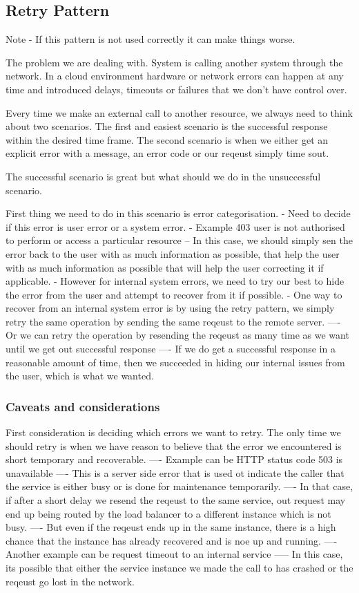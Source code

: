 \subsection{Retry Pattern}
Note - If this pattern is not used correctly it can make things worse.

The problem we are dealing with.
System is calling another system through the network.
In a cloud environment hardware or network errors can happen at any time and introduced delays, timeouts or failures that we don't have control over.

Every time we make an external call to another resource, we always need to think about two scenarios.
The first and easiest scenario is the successful response within the desired time frame.
The second scenario is when we either get an explicit error with a message, an error code or our reqeust simply time sout.

The successful scenario is great but what should we do in the unsuccessful scenario.

First thing we need to do in this scenario is error categorisation.
- Need to decide if this error is user error or a system error.
- Example 403 user is not authorised to perform or access a particular resource
-- In this case, we should simply sen the error back to the user with as much information as possible, that help the user with as much information as possible that will help the user correcting it if applicable.
- However for internal system errors, we need to try our best to hide the error from the user and attempt to recover from it if possible.
- One way to recover from an internal system error is by using the retry pattern, we simply retry the same operation by sending the same reqeust to the remote server.
---- Or we can retry the operation by resending the reqeust as many time as we want until we get out successful response
---- If we do get a successful response in a reasonable amount of time, then we succeeded in hiding our internal issues from the user, which is what we wanted.

\subsubsection{Caveats and considerations}
First consideration is deciding which errors we want to retry.
The only time we should retry is when we have reason to believe that the error we encountered is short temporary and recoverable.
---- Example can be HTTP status code 503 is unavailable
---- This is a server side error that is used ot indicate the caller that the service is either busy or is done for maintenance temporarily.
---- In that case, if after a short delay we resend the reqeust to the same service, out request may end up being routed by the load balancer to a different instance which is not busy.
---- But even if the reqeust ends up in the same instance, there is a high chance that the instance has already recovered and is noe up and running.
---- Another example can be request timeout to an internal service
----- In this case, its possible that either the service instance we made the call to has crashed or the reqeust go lost in the network.

